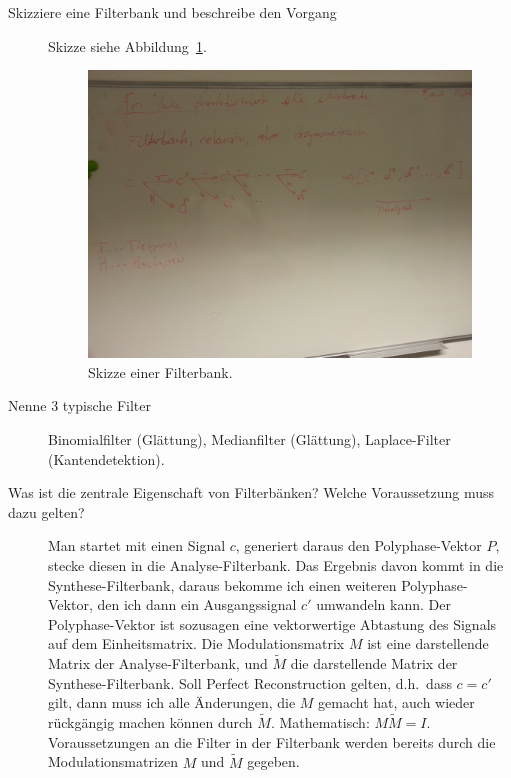 \begin{description}
	\item[Skizziere eine Filterbank und beschreibe den Vorgang]
	Skizze siehe Abbildung~\ref{fig:Filterbank1}.
    \begin{figure}[ht]
    \centering
    \includegraphics[width=\linewidth]{Fotos/Filterbank1}
    \caption{Skizze einer Filterbank.}
    \label{fig:Filterbank1}
    \end{figure}
	\item[Nenne 3 typische Filter]
  	Binomialfilter (Glättung), Medianfilter (Glättung), Laplace-Filter (Kantendetektion).
	\item[Was ist die zentrale Eigenschaft von Filterbänken? Welche Voraussetzung muss dazu gelten?]
  	Man startet mit einen Signal $ c $, generiert daraus den Polyphase-Vektor $ P $, stecke diesen 
  	in die Analyse-Filterbank. Das Ergebnis davon kommt in die Synthese-Filterbank, daraus bekomme 
  	ich einen weiteren Polyphase-Vektor, den ich dann ein Ausgangssignal $ c' $ umwandeln kann.
  	Der Polyphase-Vektor ist sozusagen eine vektorwertige Abtastung des Signals auf dem 
  	Einheitsmatrix. Die Modulationsmatrix $ M $ ist eine darstellende Matrix der 
  	Analyse-Filterbank, und $ \widetilde{M} $ die darstellende Matrix der Synthese-Filterbank.
  	Soll Perfect Reconstruction gelten, d.h.\ dass $ c = c' $ gilt, dann muss ich alle Änderungen, 
  	die $ M $ gemacht hat, auch wieder rückgängig machen können durch $ \widetilde{M} $. 
  	Mathematisch: $ M \widetilde{M} = I $. Voraussetzungen an die Filter in der Filterbank werden 
  	bereits durch die Modulationsmatrizen $ M $ und $ \widetilde{M} $ gegeben.
  	

\end{description}
